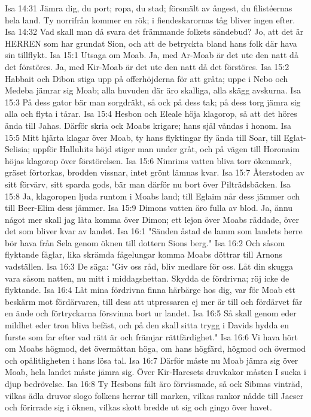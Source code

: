 Isa 14:31  Jämra dig, du port; ropa, du stad; försmält av ångest, du filistéernas hela land. Ty norrifrån kommer en rök; i fiendeskarornas tåg bliver ingen efter.
Isa 14:32  Vad skall man då svara det främmande folkets sändebud? Jo, att det är HERREN som har grundat Sion, och att de betryckta bland hans folk där hava sin tillflykt.
Isa 15:1  Utsaga om Moab. Ja, med Ar-Moab är det ute den natt då det förstöres. Ja, med Kir-Moab är det ute den natt då det förstöres.
Isa 15:2  Habbait och Dibon stiga upp på offerhöjderna för att gråta; uppe i Nebo och Medeba jämrar sig Moab; alla huvuden där äro skalliga, alla skägg avskurna.
Isa 15:3  På dess gator bär man sorgdräkt, så ock på dess tak; på dess torg jämra sig alla och flyta i tårar.
Isa 15:4  Hesbon och Eleale höja klagorop, så att det höres ända till Jahas. Därför skria ock Moabs krigare; hans själ våndas i honom.
Isa 15:5  Mitt hjärta klagar över Moab, ty hans flyktingar fly ända till Soar, till Eglat-Selisia; uppför Halluhits höjd stiger man under gråt, och på vägen till Horonaim höjas klagorop över förstörelsen.
Isa 15:6  Nimrims vatten bliva torr ökenmark, gräset förtorkas, brodden vissnar, intet grönt lämnas kvar.
Isa 15:7  Återstoden av sitt förvärv, sitt sparda gods, bär man därför nu bort över Pilträdsbäcken.
Isa 15:8  Ja, klagoropen ljuda runtom i Moabs land; till Eglaim når dess jämmer och till Beer-Elim dess jämmer.
Isa 15:9  Dimons vatten äro fulla av blod. Ja, ännu något mer skall jag låta komma över Dimon; ett lejon över Moabs räddade, över det som bliver kvar av landet.
Isa 16:1  "Sänden åstad de lamm som landets herre bör hava från Sela genom öknen till dottern Sions berg."
Isa 16:2  Och såsom flyktande fåglar, lika skrämda fågelungar komma Moabs döttrar till Arnons vadställen.
Isa 16:3  De säga: "Giv oss råd, bliv medlare för oss. Låt din skugga vara såsom natten, nu mitt i middagshettan. Skydda de fördrivna; röj icke de flyktande.
Isa 16:4  Låt mina fördrivna finna härbärge hos dig, var för Moab ett beskärm mot fördärvaren, till dess att utpressaren ej mer är till och fördärvet får en ände och förtryckarna försvinna bort ur landet.
Isa 16:5  Så skall genom eder mildhet eder tron bliva befäst, och på den skall sitta trygg i Davids hydda en furste som far efter vad rätt är och främjar rättfärdighet."
Isa 16:6  Vi hava hört om Moabs högmod, det övermåttan höga, om hans högfärd, högmod och övermod och opålitligheten i hans lösa tal.
Isa 16:7  Därför måste nu Moab jämra sig över Moab, hela landet måste jämra sig. Över Kir-Haresets druvkakor måsten I sucka i djup bedrövelse.
Isa 16:8  Ty Hesbons fält äro förvissnade, så ock Sibmas vinträd, vilkas ädla druvor slogo folkens herrar till marken, vilkas rankor nådde till Jaeser och förirrade sig i öknen, vilkas skott bredde ut sig och gingo över havet.
